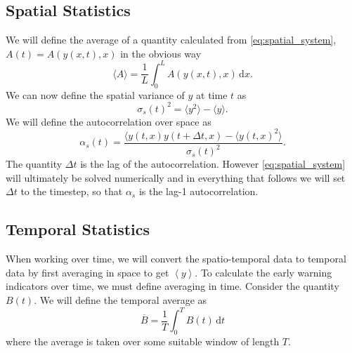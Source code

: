 \subsection{Spatial Statistics}

We will define the average of a quantity calculated from \cref{eq:spatial_system}, $A(t) = A(y(x,t),x)$ in the obvious way
\begin{equation}
  \label{eq:definition_of_average}
  \langle A \rangle = \frac{1}{L}\int_0^L A(y(x,t),x) \,\mathrm{d}x.
\end{equation}
We can now define the spatial variance of $y$ at time $t$ as
\begin{equation}
  \label{eq:spatial_variance}
  \sigma_s(t)^2 = \langle y^2 \rangle - \langle y \rangle.
\end{equation}
We will define the autocorrelation over space as
\begin{equation}
  \label{eq:spatial_autocorrelation}
  \alpha_s(t) = \frac{\langle y(t,x)y(t+\Delta t,x) - \langle y(t,x)^2 \rangle }{\sigma_s(t)^2}.
\end{equation}
The quantity $\Delta t$ is the lag of the autocorrelation. However \cref{eq:spatial_system} will ultimately be solved numerically and
in everything that follows we will set $\Delta t$ to the timestep, so that $\alpha_s$ is the lag-1 autocorrelation.

\subsection{Temporal Statistics}
When working over time, we will convert the spatio-temporal data to temporal data by first averaging in space to get $\left\langle y \right\rangle$.
To calculate the early warning indicators over time, we must define averaging in time. Consider the quantity $B(t)$. We will
define the temporal average as
\begin{equation}
  \label{eq:definition_of_temporal_average}
  \overline{B} = \frac{1}{T}\int_0^TB(t)\,\mathrm{d}t
\end{equation}
where the average is taken over some suitable window of length $T$.

